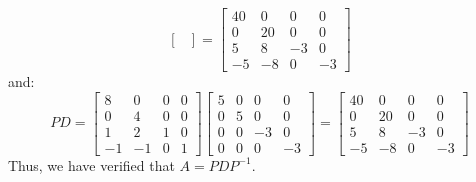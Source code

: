 \begin{eg}
\[\begin{bmatrix}
    \end{bmatrix} = \begin{bmatrix}
        40 & 0 & 0 & 0 \\ 0 & 20 & 0 & 0 \\ 5 & 8 & -3 & 0 \\ -5 & -8 & 0 & -3
    \end{bmatrix}\]
    and:
    \[P D = \begin{bmatrix}
        8 & 0 & 0 & 0 \\ 0 & 4 & 0 & 0 \\ 1 & 2 & 1 & 0 \\ -1 & -1 & 0 & 1
    \end{bmatrix} \begin{bmatrix}
        5 & 0 & 0 & 0 \\ 0 & 5 & 0 & 0 \\ 0 & 0 & -3 & 0 \\ 0 & 0 & 0 & -3
    \end{bmatrix} = \begin{bmatrix}
        40 & 0 & 0 & 0 \\ 0 & 20 & 0 & 0 \\ 5 & 8 & -3 & 0 \\ -5 & -8 & 0 & -3
    \end{bmatrix}\]
    Thus, we have verified that $A = P D P^{-1}$.
\end{eg}

